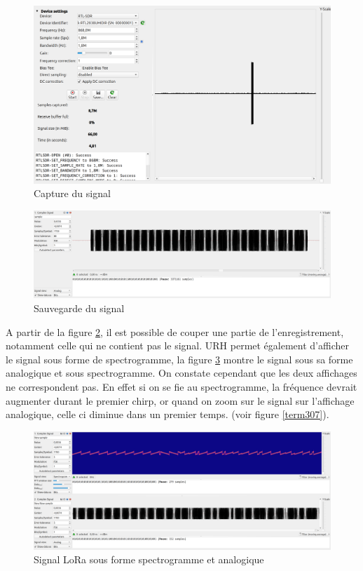 \begin{figure}[h]
\centering

\includegraphics[scale=0.17]{images/urh2n.png}
\caption{Capture du signal}
\label{term303}
\end{figure}

\begin{figure}[h]
\centering

\includegraphics[scale=0.11]{images/urh3n.png}
\caption{Sauvegarde du signal}
\label{term304}
\end{figure}

A partir de la figure \ref{term304}, il est possible de couper une partie de l'enregistrement, notamment celle qui ne contient pas le signal. URH permet également d'afficher le signal sous forme de spectrogramme, la figure \ref{term306} montre le signal sous sa forme analogique et sous spectrogramme. On constate cependant que les deux affichages ne correspondent pas. En effet si on se fie au spectrogramme, la fréquence devrait augmenter durant le premier chirp, or quand on zoom sur le signal sur l'affichage analogique, celle ci diminue dans un premier temps. (voir figure \ref{term307}).

\begin{figure}[h]
\centering

\includegraphics[scale=0.11]{images/urh4.png}
\caption{Signal LoRa sous forme spectrogramme et analogique}\label{term306}
\end{figure}

